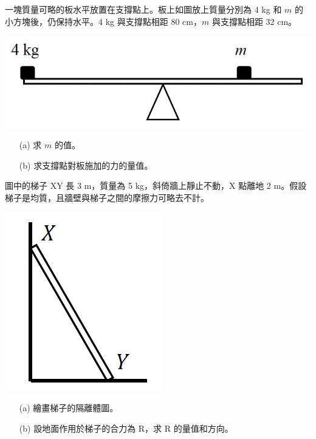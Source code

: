 \documentclass[beamer=true]{standalone}
\begin{document}
\begin{eg}
    一塊質量可略的板水平放置在支撐點上。板上如圖放上質量分別為 4 kg 和 $m$ 的小方塊後，仍保持水平。4 kg 與支撐點相距 80 cm，$m$ 與支撐點相距 32 cm。
    {\par\centering
    \includegraphics[width=.4\textwidth]{assets/b025a484.png}
    \par}

\end{eg}

\begin{eg}
    \begin{itemize}
        \item [(a)] 求 $m$ 的值。
    \end{itemize}
\end{eg}

\begin{eg}
    \begin{itemize}
        \item [(b)]求支撐點對板施加的力的量值。
    \end{itemize}
\end{eg}

\begin{eg}
    圖中的梯子 XY 長 3 m，質量為 5 kg，斜倚牆上靜止不動，X 點離地 2 m。假設梯子是均質，且牆壁與梯子之間的摩擦力可略去不計。
    {\par\centering
    \includegraphics[width=.25\textwidth]{assets/0ba0e131.png}
    \par}
    \begin{itemize}
        \item [(a)] 繪畫梯子的隔離體圖。
    \end{itemize}
\end{eg}
\begin{eg}
    \begin{itemize}
        \item [(b)] 設地面作用於梯子的合力為 R，求 R 的量值和方向。
    \end{itemize}
\end{eg}
\end{document}

